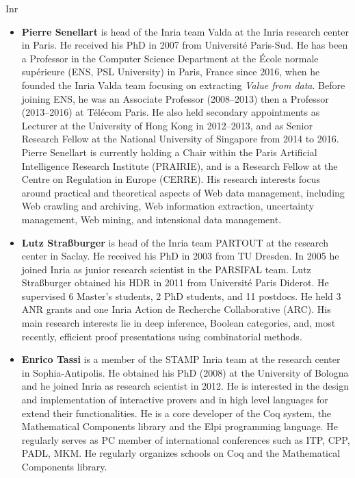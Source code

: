 \begin{sitedescription}{Inr}
\begin{itemize}
\item{\bf Pierre Senellart} is head of the Inria team Valda at the Inria
  research center in Paris. He
  received his PhD in 2007 from Université Paris-Sud. He has been a
    Professor in the Computer Science Department at the École normale
    supérieure (ENS, PSL University) in Paris, France since 2016, when he
    founded the Inria Valda team focusing on extracting \emph{Value from
    data}. Before joining ENS, he was an Associate Professor (2008–2013)
    then a Professor (2013–2016) at Télécom Paris. He also held secondary
    appointments as Lecturer at the University of Hong Kong in 2012–2013,
    and as Senior Research Fellow at the National University of Singapore
    from 2014 to 2016. Pierre Senellart is currently holding a Chair
    within the Paris Artificial Intelligence Research Institute
    (PRAIRIE), and is a Research Fellow at the Centre on Regulation in
    Europe (CERRE).
    His research interests
    focus around practical and theoretical aspects of Web data
    management, including Web crawling and archiving, Web information
    extraction, uncertainty management, Web mining, and intensional data
    management.

\item{\bf Lutz Straßburger} is head of the Inria team PARTOUT at the research
center in Saclay. He received his PhD in 2003 from TU Dresden.
In 2005 he joined Inria as junior research scientist in the PARSIFAL
team. Lutz Straßburger obtained his HDR in 2011 from Université Paris
Diderot.  He supervised 6 Master’s students, 2 PhD students, and 11
postdocs. He held 3 ANR grants and one Inria Action de Recherche
Collaborative (ARC).  His main research interests lie in deep
inference, Boolean categories, and, most recently, efficient proof
presentations using combinatorial methods.

\item{\bf Enrico Tassi} is a member of the STAMP Inria team at the research
center in Sophia-Antipolis. He obtained his PhD (2008) at the University of
Bologna and he joined Inria as research scientist in 2012.
He is interested in the design and implementation of interactive
provers and in high level languages for extend their functionalities.
He is a core developer of the Coq system, the Mathematical Components library
and the Elpi programming language. He regularly serves as PC member of
international conferences such as ITP, CPP, PADL, MKM. He regularly organizes
schools on Coq and the Mathematical Components library.



\end{itemize}

\end{sitedescription}

